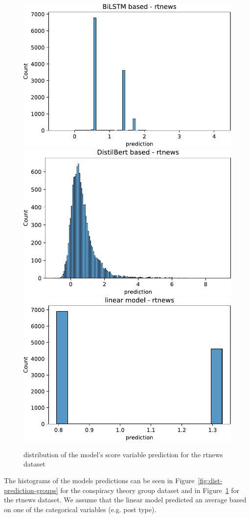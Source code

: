 \begin{figure}[tb]
    \centering
    \includegraphics[width=.33\textwidth]{figures/prediction_rtnews/bilstm_dist.pdf}
    \includegraphics[width=.32\textwidth]{figures/prediction_rtnews/distil_bert_dist.pdf}
    \includegraphics[width=.33\textwidth]{figures/prediction_rtnews/linear_model_prediction_dist.pdf}
    \caption{distribution of the model's score variable prediction for the rtnews dataset}
    \label{fig:dist-prediction-rtnews}
\end{figure}
The histograms of the models predictions can be seen in Figure~\ref{fig:dist-prediction-groups}
for the conspiracy theory group dataset and in Figure~\ref{fig:dist-prediction-rtnews} for 
the rtnews dataset. We assume that the linear model predicted an average based on one of 
the categorical variables (e.g. post type).